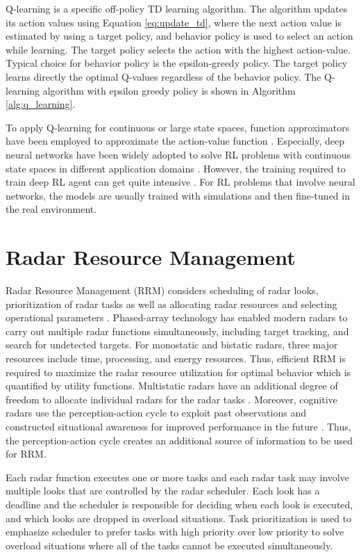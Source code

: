\documentclass[english, 12pt, a4paper, elec, utf8, a-1b, online]{aaltothesis}
\begin{document}
Q-learning is a specific off-policy TD learning algorithm. 
The algorithm updates its action values using Equation \eqref{eq:update_td}, where the next action value is estimated by using a target policy, 
and behavior policy is used to select an action while learning. 
The target policy selects the action with the highest action-value.
Typical choice for behavior policy is the epsilon-greedy policy. 
The target policy learns directly the optimal Q-values regardless of the behavior policy. 
The Q-learning algorithm with epsilon greedy policy is shown in Algorithm \ref{alg:q_learning}.

To apply Q-learning for continuous or large state spaces, function approximators have been employed to approximate the action-value function \cite{Sutton2018}. 
Especially, deep neural networks have been widely adopted to solve RL problems with continuous state spaces in different application domains \cite{Mnih2013, Zhang2018, Luong2018}.
However, the training required to train deep RL agent can get quite intensive \cite{Irpan2018}.
For RL problems that involve neural networks, the models are usually trained with simulations and then fine-tuned in the real environment.


\clearpage
\section{Radar Resource Management} \label{sec:existing_RRM}

Radar Resource Management (RRM) considers scheduling of radar looks, prioritization of radar tasks as well as allocating radar resources and selecting operational parameters \cite{Moo2016}. 
Phased-array technology has enabled modern radars to carry out multiple radar functions simultaneously, including target tracking, and search for undetected targets. 
For monostatic and bistatic radars, three major resources include time, processing, and energy resources. 
Thus, efficient RRM is required to maximize the radar resource utilization for optimal behavior which is quantified by utility functions. 
Multistatic radars have an additional degree of freedom to allocate individual radars for the radar tasks \cite{Moo2016}. 
Moreover, cognitive radars use the perception-action cycle to exploit past observations and constructed situational awareness for improved performance in the future \cite{Haykin2006}. 
Thus, the perception-action cycle creates an additional source of information to be used for RRM.

Each radar function executes one or more tasks and each radar task may involve multiple looks that are controlled by the radar scheduler. 
Each look has a deadline and the scheduler is responsible for deciding when each look is executed, and which looks are dropped in overload situations. 
Task prioritization is used to emphasize scheduler to prefer tasks with high priority over low priority to solve overload situations where all of the tasks cannot be executed simultaneously.
\end{document}
